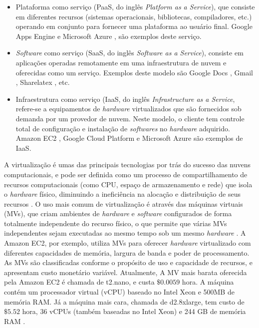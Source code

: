 \begin{itemize}
    \item Plataforma como serviço (PaaS, do inglês \textit{Platform as a Service}), que consiste em diferentes recursos (sistemas operacionais, bibliotecas, compiladores, etc.) operando em conjunto para fornecer uma plataforma ao usuário final. Google Apps Engine \cite{gappEngine} e Microsoft Azure \cite{msazure}, são exemplos deste serviço.
    \item \textit{Software} como serviço (SaaS, do inglês \textit{Software as a Service}), consiste em aplicações operadas remotamente em uma infraestrutura de nuvem e oferecidas como um serviço. Exemplos deste modelo são Google Docs \cite{docs}, Gmail \cite{gmail}, Sharelatex \cite{sharelatex}, etc.
    \item Infraestrutura como serviço (IaaS, do inglês \textit{Infrastructure as a Service}, refere-se a equipamentos de \textit{hardware} virtualizados que são fornecidos sob demanda por um provedor de nuvem. Neste modelo, o cliente tem controle total de configuração e instalação de \textit{softwares} no \textit{hardware} adquirido. Amazon EC2 \cite{AmazonEC2}, Google Cloud Platform \cite{gcloud}  e Microsoft Azure \cite{msazure} são exemplos de IaaS.
\end{itemize}


A virtualização é umas das principais tecnologias por trás do sucesso das nuvens computacionais, e pode ser definida como um processo de compartilhamento de recursos computacionais (como CPU, espaço de armazenamento e rede) que isola o \textit{hardware} físico, diminuindo a ineficiência na alocação e distribuição de seus recursos \cite{Hashem15}. O uso mais comum de virtualização é através das máquinas virtuais (MVs), que criam ambientes de \textit{hardware} e \textit{software} configurados de forma totalmente independente do recurso físico, o que permite que várias MVs independentes sejam executadas ao mesmo tempo sob um mesmo \textit{hardware} \cite{hoffa08}. A Amazon EC2, por exemplo, utiliza MVs para oferecer \textit{hardware} virtualizado com diferentes capacidades de memória, largura de banda e poder de processamento. As MVs são classificadas conforme o propósito de uso e capacidade de recursos, e apresentam custo monetário variável. Atualmente, A MV mais barata oferecida pela Amazon EC2 é chamada de t2.nano, e custa $\$0.0059$ hora. A máquina contém um processador virtual (vCPU) baseado no Intel Xeon e 500MB de memória RAM. Já a máquina mais cara, chamada de d2.8xlarge, tem custo de $\$5.52$ hora, 36 vCPUs (também baseadas  no Intel Xeon) e 244 GB de memória RAM \cite{AmazonEC2}.

